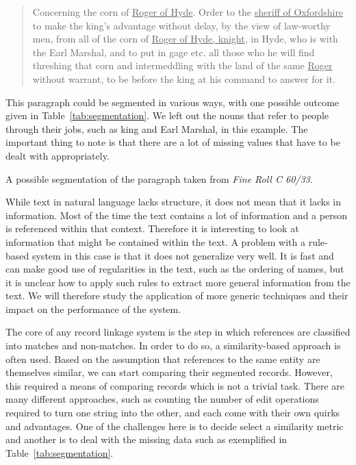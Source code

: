 \documentclass[paper=a4, fontsize=11pt]{scrartcl}
\begin{document}
\begin{quote}
	Concerning the corn of \ul{Roger of Hyde}. Order to the \ul{sheriff of Oxfordshire} to make the king’s advantage without delay, by the view of law-worthy men, from all of the corn of \ul{Roger of Hyde, knight}, in Hyde, who is with the Earl Marshal, and to put in gage etc. all those who he will find threshing that corn and intermeddling with the land of the same \ul{Roger} without warrant, to be before the king at his command to answer for it.
\end{quote}

\noindent This paragraph could be segmented in various ways, with one possible outcome given in Table~\ref{tab:segmentation}.
We left out the nouns that refer to people through their jobs, such as king and Earl Marshal, in this example.
The important thing to note is that there are a lot of missing values that have to be dealt with appropriately.

\begin{table}
	\centering
	
	\caption{A possible segmentation of the paragraph taken from \emph{Fine Roll C 60/33}.}
	\label{tab:segmentation}
\end{table}

While text in natural language lacks structure, it does not mean that it lacks in information.
Most of the time the text contains a lot of information and a person is referenced within that context.
Therefore it is interesting to look at information that might be contained within the text.
A problem with a rule-based system in this case is that it does not generalize very well.
It is fast and can make good use of regularities in the text, such as the ordering of names, but it is unclear how to apply such rules to extract more general information from the text.
We will therefore study the application of more generic techniques and their impact on the performance of the system.

The core of any record linkage system is the step in which references are classified into matches and non-matches.
In order to do so, a similarity-based approach is often used.
Based on the assumption that references to the same entity are themselves similar, we can start comparing their segmented records.
However, this required a means of comparing records which is not a trivial task.
There are many different approaches, such as counting the number of edit operations required to turn one string into the other, and each come with their own quirks and advantages.
One of the challenges here is to decide select a similarity metric and another is to deal with the missing data such as exemplified in Table~\ref{tab:segmentation}.
\end{document}
